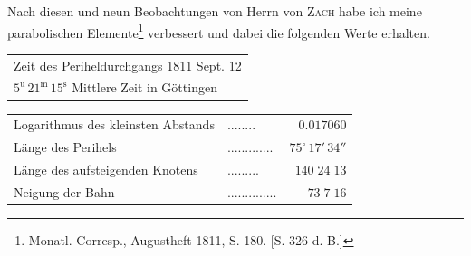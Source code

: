 \par\indent Nach diesen und neun Beobachtungen von Herrn von \textsc{Zach} habe ich meine parabolischen Elemente\footnote{Monatl. Corresp., Augustheft 1811, S. 180. [S. 326 d. B.]} verbessert und dabei die folgenden Werte erhalten.
\begin{center}\fontsize{10}{12}\selectfont\setlength{\tabcolsep}{4pt}\renewcommand{\arraystretch}{1.15}\begin{tabular}{l}
Zeit des Periheldurchgangs 1811 Sept. 12\\
\quad $5^{\mathrm u}\,21^{\mathrm m}\,15^{\mathrm s}$ Mittlere Zeit in Göttingen\\
\end{tabular}\end{center}
\begin{center}\fontsize{10}{12}\selectfont\setlength{\tabcolsep}{4pt}\renewcommand{\arraystretch}{1.15}\begin{tabular}{llr}
Logarithmus des kleinsten Abstands & .\;.\;.\;.\;.\;.\;.\;. & $0.017060$\\
Länge des Perihels & .\;.\;.\;.\;.\;.\;.\;.\;.\;.\;.\;.\;. & $75^\circ\,17'\,34''$\\
Länge des aufsteigenden Knotens & .\;.\;.\;.\;.\;.\;.\;.\;. & $140\;24\;13$\\
Neigung der Bahn & .\;.\;.\;.\;.\;.\;.\;.\;.\;.\;.\;.\;.\;. & $73\;7\;16$\\
\end{tabular}\end{center}

